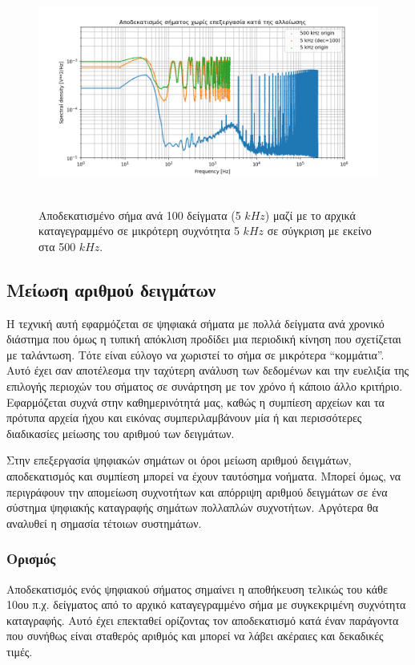 \documentclass[breaklines=true, 12pt]{article}
\begin{document}
{{{\begin{figure}[htbp]
\centering
\includegraphics[width=500px,height=280px]{./decimation/with_aliasing.png}
\caption{Αποδεκατισμένο σήμα ανά 100 δείγματα (5 \(kHz\)) μαζί με το αρχικά καταγεγραμμένο σε μικρότερη συχνότητα 5 \(kHz\) σε σύγκριση με εκείνο στα 500 \(kHz\).}
\end{figure}
\subsection{Μείωση αριθμού δειγμάτων}
\label{sec:org83907a3}
Η τεχνική αυτή εφαρμόζεται σε ψηφιακά σήματα με πολλά δείγματα ανά
χρονικό διάστημα που όμως η τυπική απόκλιση προδίδει μια περιοδική
κίνηση που σχετίζεται με ταλάντωση. Τότε είναι εύλογο να χωριστεί το
σήμα σε μικρότερα “κομμάτια”. Αυτό έχει σαν αποτέλεσμα την ταχύτερη
ανάλυση των δεδομένων και την ευελιξία της επιλογής περιοχών του σήματος σε
συνάρτηση με τον χρόνο ή κάποιο άλλο κριτήριο. Εφαρμόζεται συχνά στην
καθημερινότητά μας, καθώς η συμπίεση αρχείων και τα πρότυπα αρχεία ήχου
και εικόνας συμπεριλαμβάνουν μία ή και περισσότερες διαδικασίες μείωσης
του αριθμού των δειγμάτων.

Στην επεξεργασία ψηφιακών σημάτων οι όροι μείωση αριθμού δειγμάτων,
αποδεκατισμός και συμπίεση μπορεί να έχουν ταυτόσημα νοήματα. Μπορεί όμως,
να περιγράφουν την απομείωση συχνοτήτων και απόρριψη αριθμού δειγμάτων σε
ένα σύστημα ψηφιακής καταγραφής σημάτων πολλαπλών συχνοτήτων. Αργότερα
θα αναλυθεί η σημασία τέτοιων συστημάτων.
\subsubsection{Ορισμός}
\label{sec:org684c03e}
Αποδεκατισμός ενός ψηφιακού σήματος σημαίνει η αποθήκευση τελικώς του
κάθε 10ου π.χ. δείγματος από το αρχικό καταγεγραμμένο σήμα με συγκεκριμένη
συχνότητα καταγραφής. Αυτό έχει επεκταθεί ορίζοντας τον αποδεκατισμό
κατά έναν παράγοντα που συνήθως είναι σταθερός αριθμός και μπορεί να
λάβει ακέραιες και δεκαδικές τιμές.

}}}
\end{document}
